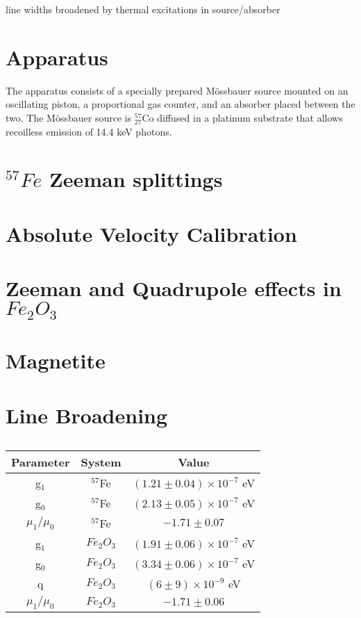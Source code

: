 line widths broadened by thermal excitations in source/absorber

\section{Apparatus}

The apparatus consists of a specially prepared M{\"o}ssbauer source mounted on an oscillating piston, a proportional gas counter, and an absorber placed between the two. The M{\"o}ssbauer source is $^{57}_{27}$Co diffused in a platinum substrate that allows recoilless emission of 14.4 keV photons. 

\section{$^{57}Fe$ Zeeman splittings}

\section{Absolute Velocity Calibration}

\section{Zeeman and Quadrupole effects in $Fe_{2}O_{3}$}

\section{Magnetite}

\section{Line Broadening}

\begin{table}[h]
\caption{\label{table}}
\begin{tabular}{|c|c|c|}
\hline
Parameter & System & Value \\
\hline
g$_1$ & $^{57}$Fe & $(1.21\pm0.04)\times 10^{-7}$ eV \\
\hline
g$_0$ & $^{57}$Fe & $(2.13\pm0.05)\times 10^{-7}$ eV \\
\hline
$\mu_1 / \mu_0$ & $^{57}$Fe & $-1.71\pm0.07$ \\
\hline
g$_1$ & $Fe_2 O_3$ & $(1.91\pm0.06)\times 10^{-7}$ eV \\
\hline
g$_0$ & $Fe_2 O_3$ & $(3.34\pm0.06)\times 10^{-7}$ eV\\
\hline
q & $Fe_2 O_3$ & $(6\pm9)\times 10^{-9}$ eV\\
\hline
$\mu_1 / \mu_0$ & $Fe_2 O_3$ & $-1.71\pm0.06$ \\
\hline
\end{tabular}
\end{table}

